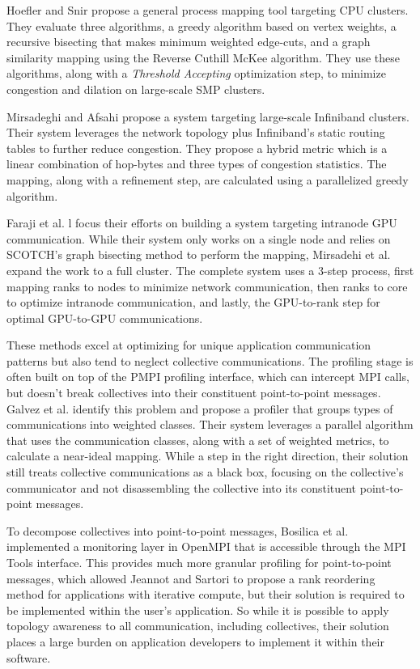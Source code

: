 Hoefler and Snir \cite{Hoefler2011GenericTopoMappingStrats} propose a general process mapping tool targeting CPU clusters.
They evaluate three algorithms, a greedy algorithm based on vertex weights, a recursive bisecting that makes minimum weighted edge-cuts, and a graph similarity mapping using the Reverse Cuthill McKee algorithm. 
They use these algorithms, along with a \textit{Threshold Accepting} optimization step, to minimize congestion and dilation on large-scale SMP clusters.

Mirsadeghi and Afsahi \cite{Mirsadeghi2016PTRAM} propose a system targeting large-scale Infiniband clusters.
Their system leverages the network topology plus Infiniband's static routing tables to further reduce congestion.
They propose a hybrid metric which is a linear combination of hop-bytes and three types of congestion statistics. 
The mapping, along with a refinement step, are calculated using a parallelized greedy algorithm.

Faraji et al. l \cite{Faraji2016TopoAwareGPUSelection} focus their efforts on building a system targeting intranode GPU communication.
While their system only works on a single node and relies on SCOTCH's \cite{Pellegrini2012SCOTCH} graph bisecting method to perform the mapping, Mirsadehi et al. \cite{Mirsadeghi2016MAGC} expand the work to a full cluster.
The complete system uses a 3-step process, first mapping ranks to nodes to minimize network communication, then ranks to core to optimize intranode communication, and lastly, the GPU-to-rank step for optimal GPU-to-GPU communications.

These methods excel at optimizing for unique application communication patterns but also tend to neglect collective communications.
The profiling stage is often built on top of the PMPI profiling interface, which can intercept MPI calls, but doesn't break collectives into their constituent point-to-point messages.
Galvez et al. \cite{Galvez2017AutoTopoMap} identify this problem and propose a profiler that groups types of communications into weighted classes.
Their system leverages a parallel algorithm that uses the communication classes, along with a set of weighted metrics, to calculate a near-ideal mapping.
While a step in the right direction, their solution still treats collective communications as a black box, focusing on the collective's communicator and not disassembling the collective into its constituent point-to-point messages.

To decompose collectives into point-to-point messages, Bosilica et al. \cite{Bosilica2017OnlineMonitoringMPI} implemented a monitoring layer in OpenMPI that is accessible through the MPI Tools interface.
This provides much more granular profiling for point-to-point messages, which allowed Jeannot and Sartori \cite{Jeannot2020ImprvMPICommMonitoring} to propose a rank reordering method for applications with iterative compute, but their solution is required to be implemented within the user's application. 
So while it is possible to apply topology awareness to all communication, including collectives, their solution places a large burden on application developers to implement it within their software.

